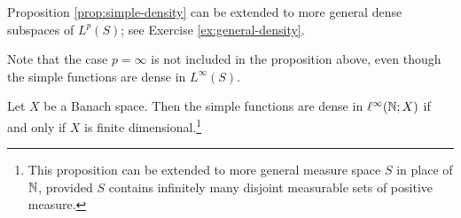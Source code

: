 \begin{rmk}
  Proposition \ref{prop:simple-density} can be extended to more general dense subspaces of $L^p(S)$; see Exercise \ref{ex:general-density}.
\end{rmk}

Note that the case $p = \infty$ is not included in the proposition above, even though the simple functions are dense in $L^\infty(S)$.

\begin{prop}
  Let $X$ be a Banach space.
  Then the simple functions are dense in $\ell^\infty(\mathbb{N};X)$ if and only if $X$ is finite dimensional.\footnote{This proposition can be extended to more general measure space $S$ in place of $\mathbb{N}$, provided $S$ contains infinitely many disjoint measurable sets of positive measure.}
\end{prop}

